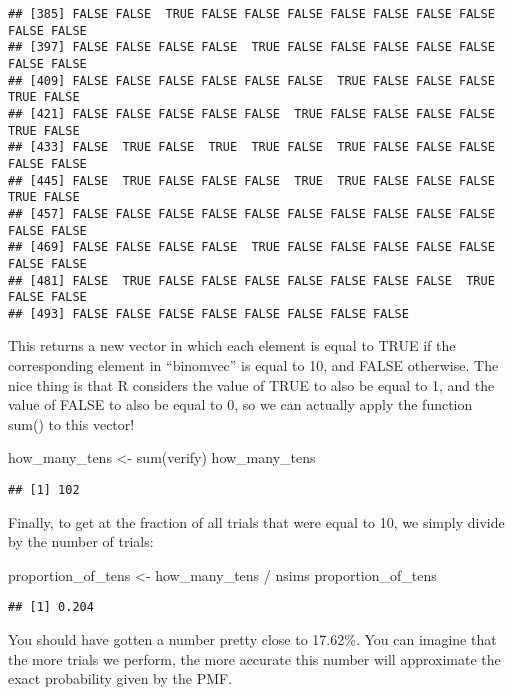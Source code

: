 \documentclass[
]{book}
\newenvironment{Shaded}{\begin{snugshade}}{\end{snugshade}}
\newcommand{\FunctionTok}[1]{\textcolor[rgb]{0.00,0.00,0.00}{#1}}
\newcommand{\NormalTok}[1]{#1}
\newcommand{\OtherTok}[1]{\textcolor[rgb]{0.56,0.35,0.01}{#1}}
\newcommand{\SpecialCharTok}[1]{\textcolor[rgb]{0.00,0.00,0.00}{#1}}
\begin{document}
\begin{verbatim}
## [385] FALSE FALSE  TRUE FALSE FALSE FALSE FALSE FALSE FALSE FALSE FALSE FALSE
## [397] FALSE FALSE FALSE FALSE  TRUE FALSE FALSE FALSE FALSE FALSE FALSE FALSE
## [409] FALSE FALSE FALSE FALSE FALSE FALSE  TRUE FALSE FALSE FALSE  TRUE FALSE
## [421] FALSE FALSE FALSE FALSE FALSE  TRUE FALSE FALSE FALSE FALSE  TRUE FALSE
## [433] FALSE  TRUE FALSE  TRUE  TRUE FALSE  TRUE FALSE FALSE FALSE FALSE FALSE
## [445] FALSE  TRUE FALSE FALSE FALSE  TRUE  TRUE FALSE FALSE FALSE  TRUE FALSE
## [457] FALSE FALSE FALSE FALSE FALSE FALSE FALSE FALSE FALSE FALSE FALSE FALSE
## [469] FALSE FALSE FALSE FALSE  TRUE FALSE FALSE FALSE FALSE FALSE FALSE FALSE
## [481] FALSE  TRUE FALSE FALSE FALSE FALSE FALSE FALSE FALSE  TRUE FALSE FALSE
## [493] FALSE FALSE FALSE FALSE FALSE FALSE FALSE FALSE
\end{verbatim}

This returns a new vector in which each element is equal to TRUE if the corresponding element in ``binomvec'' is equal to 10, and FALSE otherwise. The nice thing is that R considers the value of TRUE to also be equal to 1, and the value of FALSE to also be equal to 0, so we can actually apply the function sum() to this vector!

\begin{Shaded}
\begin{Highlighting}[]
\NormalTok{how\_many\_tens }\OtherTok{\textless{}{-}} \FunctionTok{sum}\NormalTok{(verify)}
\NormalTok{how\_many\_tens}
\end{Highlighting}
\end{Shaded}

\begin{verbatim}
## [1] 102
\end{verbatim}

Finally, to get at the fraction of all trials that were equal to 10, we simply divide by the number of trials:

\begin{Shaded}
\begin{Highlighting}[]
\NormalTok{proportion\_of\_tens }\OtherTok{\textless{}{-}}\NormalTok{ how\_many\_tens }\SpecialCharTok{/}\NormalTok{ nsims}
\NormalTok{proportion\_of\_tens}
\end{Highlighting}
\end{Shaded}

\begin{verbatim}
## [1] 0.204
\end{verbatim}

You should have gotten a number pretty close to 17.62\%. You can imagine that the more trials we perform, the more accurate this number will approximate the exact probability given by the PMF.
\end{document}
